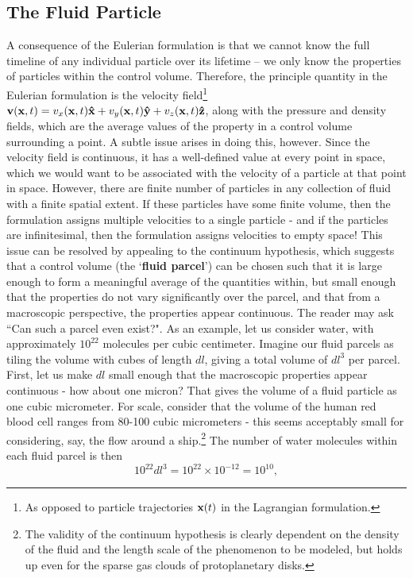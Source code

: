 \subsection{The Fluid Particle}
A consequence of the Eulerian formulation is that we cannot know the full timeline of any individual particle over its lifetime -- we only know the properties of particles within the control volume. Therefore, the principle quantity in the Eulerian formulation is the {velocity field}\footnote{As opposed to particle trajectories $\mathbf{x}(t)$ in the Lagrangian formulation.} $\mathbf{v}(\mathbf{x},t) = v_x(\mathbf{x},t) \mathbf{\hat{x}} + v_y (\mathbf{x},t)\mathbf{\hat{y}} + v_z(\mathbf{x},t) \mathbf{\hat{z}}$, along with the pressure and density fields, which are the average values of the property in a control volume surrounding a point. A subtle issue arises in doing this, however. Since the velocity field is continuous, it has a well-defined value at every point in space, which we would want to be associated with the velocity of a particle at that point in space. However, there are finite number of particles in any collection of fluid with a finite spatial extent. If these particles have some finite volume, then the formulation assigns multiple velocities to a single particle - and if the particles are infinitesimal, then the formulation assigns velocities to empty space! This issue can be resolved by appealing to the continuum hypothesis, which suggests that a control volume (the `{\bf fluid parcel}') can be chosen such that it is large enough to form a meaningful average of the quantities within, but small enough that the properties do not vary significantly over the parcel, and that from a macroscopic perspective, the properties appear continuous. 
The reader may ask ``Can such a  parcel even exist?". As an example, let us consider water, with approximately $10^{22}$ molecules per cubic centimeter. Imagine our fluid parcels as tiling the volume with cubes of length $dl$, giving a total volume of $dl^3$ per parcel. First, let us make $dl$ small enough that the macroscopic properties appear continuous - how about one micron? That gives the volume of a fluid particle as one cubic micrometer. For scale, consider that the volume of the human red blood cell ranges from 80-100 cubic micrometers - this seems acceptably small for considering, say, the flow around a ship.\footnote{The validity of the continuum hypothesis is clearly dependent on the density of the fluid and the length scale of the phenomenon to be modeled, but holds up even for the sparse gas clouds of protoplanetary disks.} The number of water molecules within each fluid parcel is then 
\begin{equation}
10^{22}dl^3 = 10^{22} \times 10^{-12} = 10^{10},
\end{equation}   

